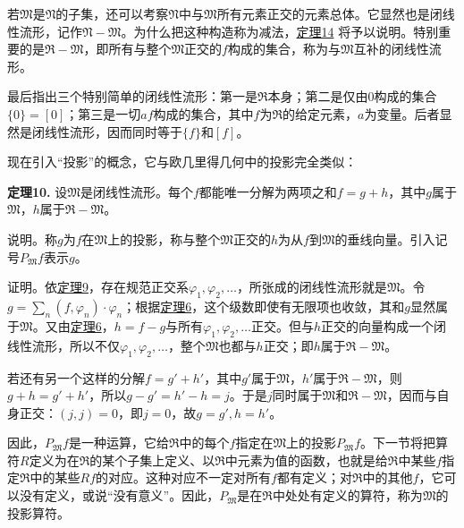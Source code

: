 \documentclass[fontsize=13pt,twoside,openany,headings=normal,parskip=false,bookmarkpackage=false,DIV=calc]{scrbook}
\newcommand{\textkaishu}[1]{{\zhkaishu #1}}
\begin{document}
若$\mathfrak{M}$是$\mathfrak{N}$的子集，还可以考察$\mathfrak{N}$中与$\mathfrak{M}$所有元素正交的元素总体。它显然也是闭线性流形，记作$\mathfrak{N}-\mathfrak{M}$。为什么把这种构造称为减法，\CJKglue \hyperref[thm:II.14]{定理14} 将予以说明。特别重要的是$\mathfrak{R}-\mathfrak{M}$，即所有与整个$\mathfrak{M}$正交的$f$构成的集合，称为与$\mathfrak{M}$互补的闭线性流形。

最后指出三个特别简单的闭线性流形：第一是$\mathfrak{R}$本身；第二是仅由$0$构成的集合$\{0\}=[0]$；第三是一切$af$构成的集合，其中$f$为$\mathfrak{R}$的给定元素，$a$为变量。后者显然是闭线性流形，因而同时等于$\{f\}$和$[f]$。

现在引入“投影”的概念，它与欧几里得几何中的投影完全类似：

\leavevmode{}\textbf{定理10.}\label{thm:II.10} 设$\mathfrak{M}$是闭线性流形。每个$f$都能唯一分解为两项之和$f=g+h$，其中$g$属于$\mathfrak{M}$，$h$属于$\mathfrak{R}-\mathfrak{M}$。

\textkaishu{说明。}称$g$为$f$在$\mathfrak{M}$上的投影，称与整个$\mathfrak{M}$正交的$h$为从$f$到$\mathfrak{M}$的垂线向量。引入记号$P_{\mathfrak{M}}f$表示$g$。

\textkaishu{证明。}依\CJKglue \hyperref[thm:II.9]{定理9}，存在规范正交系$\varphi_1,\allowbreak \varphi_2,\allowbreak \ldots$，所张成的闭线性流形就是$\mathfrak{M}$。令$g=\sum_n(f,\allowbreak \varphi_n)\cdot\varphi_n$；根据\CJKglue \hyperref[thm:II.6]{定理6}，这个级数即使有无限项也收敛，其和$g$显然属于$\mathfrak{M}$。又由\CJKglue \hyperref[thm:II.6]{定理6}，$h=f-g$与所有$\varphi_1,\allowbreak \varphi_2,\allowbreak \ldots$正交。但与$h$正交的向量构成一个闭线性流形，所以不仅$\varphi_1,\allowbreak \varphi_2,\allowbreak \ldots$，整个$\mathfrak{M}$也都与$h$正交；即$h$属于$\mathfrak{R}-\mathfrak{M}$。

\hypertarget{origpage-40}{}\label{origpage-40}若还有另一个这样的分解$f=g'+h'$，其中$g'$属于$\mathfrak{M}$，$h'$属于$\mathfrak{R}-\mathfrak{M}$，则$g+h=g'+h'$，所以$g-g'=h'-h=j$。于是$j$同时属于$\mathfrak{M}$和$\mathfrak{R}-\mathfrak{M}$，因而与自身正交：$(j,\allowbreak j)=0$，即$j=0$，故$g=g',\allowbreak h=h'$。

因此，$P_{\mathfrak{M}}f$是一种运算，它给$\mathfrak{R}$中的每个$f$指定在$\mathfrak{M}$上的投影$P_{\mathfrak{M}}f$。下一节将把算符$R$定义为在$\mathfrak{R}$的某个子集上定义、以$\mathfrak{R}$中元素为值的函数，也就是给$\mathfrak{R}$中某些$f$指定$\mathfrak{R}$中的某些$Rf$的对应。这种对应不一定对所有$f$都有定义；对$\mathfrak{R}$中的其他$f$，它可以没有定义，或说“没有意义”。因此，$P_{\mathfrak{M}}$是在$\mathfrak{R}$中处处有定义的算符，称为$\mathfrak{M}$的投影算符。
\end{document}
